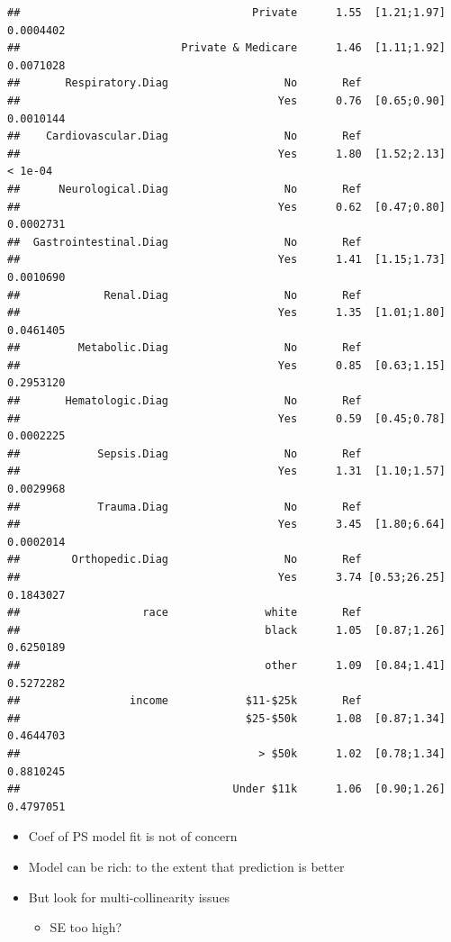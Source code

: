\documentclass[
]{book}
\providecommand{\tightlist}{%
  \setlength{\itemsep}{0pt}\setlength{\parskip}{0pt}}
\begin{document}
\begin{verbatim}
##                                    Private      1.55  [1.21;1.97]   0.0004402 
##                         Private & Medicare      1.46  [1.11;1.92]   0.0071028 
##       Respiratory.Diag                  No       Ref                          
##                                        Yes      0.76  [0.65;0.90]   0.0010144 
##    Cardiovascular.Diag                  No       Ref                          
##                                        Yes      1.80  [1.52;2.13]     < 1e-04 
##      Neurological.Diag                  No       Ref                          
##                                        Yes      0.62  [0.47;0.80]   0.0002731 
##  Gastrointestinal.Diag                  No       Ref                          
##                                        Yes      1.41  [1.15;1.73]   0.0010690 
##             Renal.Diag                  No       Ref                          
##                                        Yes      1.35  [1.01;1.80]   0.0461405 
##         Metabolic.Diag                  No       Ref                          
##                                        Yes      0.85  [0.63;1.15]   0.2953120 
##       Hematologic.Diag                  No       Ref                          
##                                        Yes      0.59  [0.45;0.78]   0.0002225 
##            Sepsis.Diag                  No       Ref                          
##                                        Yes      1.31  [1.10;1.57]   0.0029968 
##            Trauma.Diag                  No       Ref                          
##                                        Yes      3.45  [1.80;6.64]   0.0002014 
##        Orthopedic.Diag                  No       Ref                          
##                                        Yes      3.74 [0.53;26.25]   0.1843027 
##                   race               white       Ref                          
##                                      black      1.05  [0.87;1.26]   0.6250189 
##                                      other      1.09  [0.84;1.41]   0.5272282 
##                 income            $11-$25k       Ref                          
##                                   $25-$50k      1.08  [0.87;1.34]   0.4644703 
##                                     > $50k      1.02  [0.78;1.34]   0.8810245 
##                                 Under $11k      1.06  [0.90;1.26]   0.4797051
\end{verbatim}

\begin{itemize}
\tightlist
\item
  Coef of PS model fit is not of concern
\item
  Model can be rich: to the extent that prediction is better
\item
  But look for multi-collinearity issues

  \begin{itemize}
  \tightlist
  \item
    SE too high?
  \end{itemize}
\end{itemize}
\end{document}
